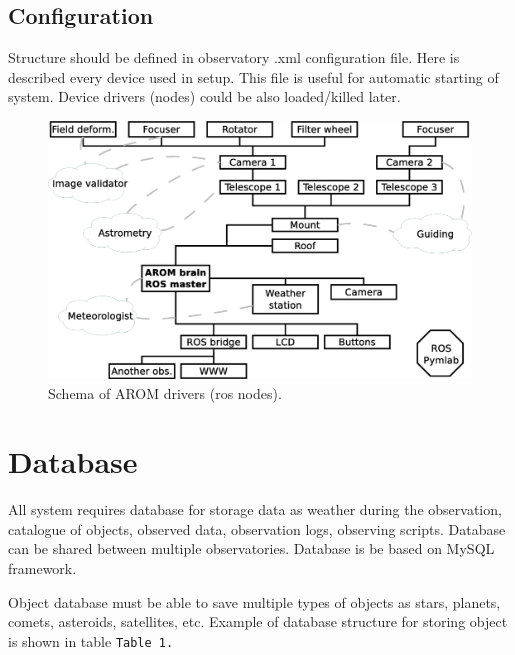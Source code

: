 \documentclass{poster16}
\begin{document}
\subsection{Configuration}
Structure should be defined in observatory .xml configuration file. Here is described every device used in setup. This file is useful for automatic starting of system. Device drivers (nodes) could be also loaded/killed later.


\begin{figure}[b!]
\begin{center}
\includegraphics[width=143mm]{img/ros_structuce.eps}
\caption{Schema of AROM drivers (ros nodes).} 
\end{center}
\end{figure}


\section{Database}
All system requires database for storage data as weather during the observation, catalogue of objects, observed data, observation logs, observing scripts. Database can be shared between multiple observatories. Database is be based on MySQL framework.

Object database must be able to save multiple types of objects as stars, planets, comets, asteroids, satellites, etc. Example of database structure for storing object is shown in table \texttt{Table 1.}
\end{document}
